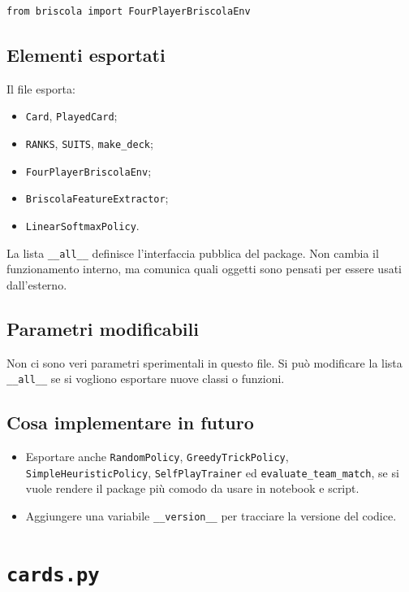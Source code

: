 \documentclass[11pt,a4paper]{article}
\begin{document}
\begin{verbatim}
from briscola import FourPlayerBriscolaEnv
\end{verbatim}

\subsection{Elementi esportati}

Il file esporta:

\begin{itemize}
  \item \texttt{Card}, \texttt{PlayedCard};
  \item \texttt{RANKS}, \texttt{SUITS}, \texttt{make\_deck};
  \item \texttt{FourPlayerBriscolaEnv};
  \item \texttt{BriscolaFeatureExtractor};
  \item \texttt{LinearSoftmaxPolicy}.
\end{itemize}

La lista \texttt{\_\_all\_\_} definisce l'interfaccia pubblica del package.
Non cambia il funzionamento interno, ma comunica quali oggetti sono pensati per
essere usati dall'esterno.

\subsection{Parametri modificabili}

Non ci sono veri parametri sperimentali in questo file. Si può modificare la
lista \texttt{\_\_all\_\_} se si vogliono esportare nuove classi o funzioni.

\subsection{Cosa implementare in futuro}

\begin{itemize}
  \item Esportare anche \texttt{RandomPolicy}, \texttt{GreedyTrickPolicy},
  \texttt{SimpleHeuristicPolicy}, \texttt{SelfPlayTrainer} ed
  \texttt{evaluate\_team\_match}, se si vuole rendere il package più comodo da
  usare in notebook e script.
  \item Aggiungere una variabile \texttt{\_\_version\_\_} per tracciare la
  versione del codice.
\end{itemize}

\section{\texttt{cards.py}}
\end{document}
